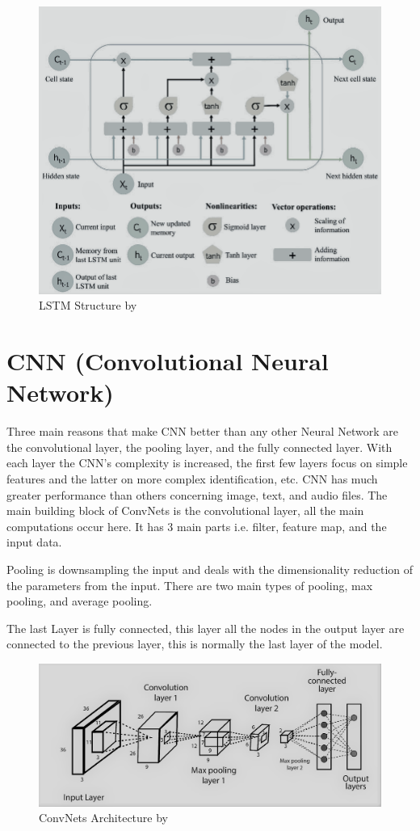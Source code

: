 \documentclass[oneside,12pt]{Classes/RoboticsLaTeX}
\begin{document}
\begin{figure}[H]
  \centering
  \includegraphics[width=0.90\linewidth]{Figures/lstm.png}
  \caption{LSTM Structure by \cite{yan}}
  \label{fig:lstm}
\end{figure}

\section{CNN (Convolutional Neural Network)}

Three main reasons that make CNN better than any other Neural Network are the convolutional layer, the pooling layer, and the fully connected layer. With each layer the CNN's complexity is increased, the first few layers focus on simple features and the latter on more complex identification, etc. CNN has much greater performance than others concerning image, text, and audio files. The main building block of ConvNets is the convolutional layer, all the main computations occur here. It has 3 main parts i.e. filter, feature map, and the input data. \cite{ibm}

Pooling is downsampling the input and deals with the dimensionality reduction of the parameters from the input. \cite{ibm} There are two main types of pooling, max pooling, and average pooling.

The last Layer is fully connected, this layer all the nodes in the output layer are connected to the previous layer, this is normally the last layer of the model.
\begin{figure}[H]
  \centering
  \includegraphics[width=0.90\linewidth]{Figures/cnn.png}
  \caption{ConvNets Architecture by \cite{cnnfig}}
  \label{fig:cnn}
\end{figure}
\end{document}
